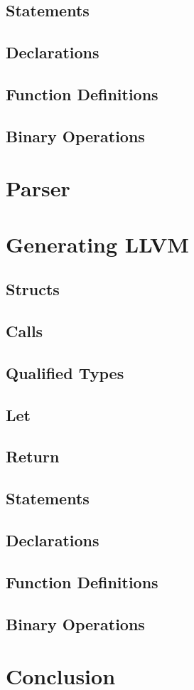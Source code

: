 \documentclass[journal=jacsat, manuscript=article]{achemso}
\begin{document}
\subsection{Statements}
\subsection{Declarations}
\subsection{Function Definitions}
\subsection{Binary Operations}

\section{Parser}

\section{Generating LLVM}
\subsection{Structs}
\subsection{Calls}
\subsection{Qualified Types}
\subsection{Let}
\subsection{Return}
\subsection{Statements}
\subsection{Declarations}
\subsection{Function Definitions}
\subsection{Binary Operations}

\section{Conclusion}
\end{document}
